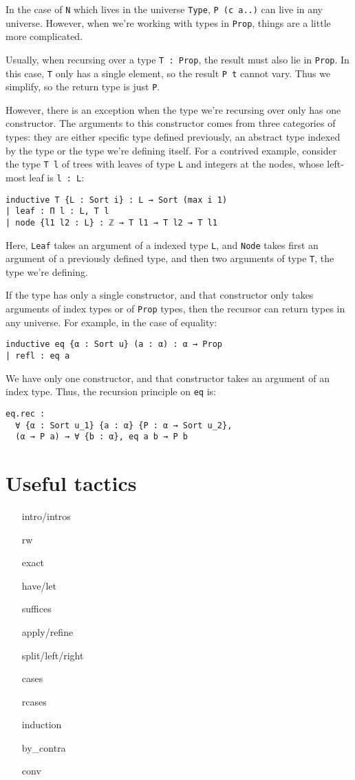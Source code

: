 \documentclass[a4paper, 12pt]{article}
\newcommand{\lean}[1]{\texttt{#1}}
\theoremstyle{changedot}
\theoremstyle{changedotbreak}
\theoremstyle{nonumberplain}
\begin{document}
In the case of \lean{N} which lives in the universe \lean{Type}, \lean{P (c a..)} can live in any universe. However, when we're working with types in \lean{Prop}, things are a little more complicated.

Usually, when recursing over a type \lean{T : Prop}, the result must also lie in \lean{Prop}. In this case, \lean{T} only has a single element, so the result \lean{P t} cannot vary. Thus we simplify, so the return type is just \lean{P}.

However, there is an exception when the type we're recursing over only has one constructor. The arguments to this constructor comes from three categories of types: they are either specific type defined previously, an abstract type indexed by the type or the type we're defining itself. For a contrived example, consider the type \lean{T l} of trees with leaves of type \lean{L} and integers at the nodes, whose left-most leaf is \lean{l : L}:
\begin{verbatim}
inductive T {L : Sort i} : L → Sort (max i 1)
| leaf : Π l : L, T l
| node {l1 l2 : L} : ℤ → T l1 → T l2 → T l1
\end{verbatim}
Here, \lean{Leaf} takes an argument of a indexed type \lean{L}, and \lean{Node} takes first an argument of a previously defined type, and then two arguments of type \lean{T}, the type we're defining.

If the type has only a single constructor, and that constructor only takes arguments of index types or of \lean{Prop} types, then the recursor can return types in any universe. For example, in the case of equality:

\begin{verbatim}
inductive eq {α : Sort u} (a : α) : α → Prop
| refl : eq a
\end{verbatim}

We have only one constructor, and that constructor takes an argument of an index type. Thus, the recursion principle on \lean{eq} is:
\begin{verbatim}
eq.rec :
  ∀ {α : Sort u_1} {a : α} {P : α → Sort u_2},
  (α → P a) → ∀ {b : α}, eq a b → P b
\end{verbatim}


\section{Useful tactics}
\begin{itemize}
  \item[intro/intros]
  \item[rw]
  \item[exact]
  \item[have/let]
  \item[suffices]
  \item[apply/refine]
  \item[split/left/right]
  \item[cases]
  \item[rcases]
  \item[induction]
  \item[by\_contra]
  \item[conv]
\end{itemize}
\end{document}
